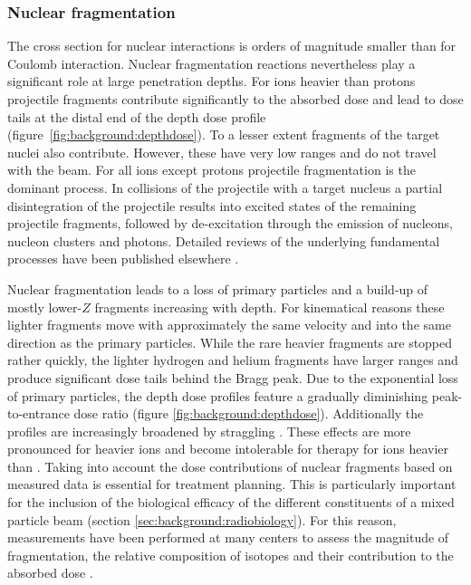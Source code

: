 \subsubsection{Nuclear fragmentation}
%
%


The cross section for nuclear interactions is orders of magnitude
smaller than for Coulomb interaction. Nuclear fragmentation reactions
nevertheless play a significant role at large penetration depths. For
ions heavier than protons projectile fragments contribute
significantly to the absorbed dose and lead to dose tails at the
distal end of the depth dose profile
(figure~\ref{fig:background:depthdose}). To a lesser extent
fragments of the target nuclei also contribute. However, these have
very low ranges and do not travel with the beam. For all ions except
protons projectile fragmentation is the dominant process. In
collisions of the projectile with a target nucleus a partial
disintegration of the projectile results into excited states of the
remaining projectile fragments, followed by de-excitation through the
emission of nucleons, nucleon clusters and photons. Detailed reviews
of the underlying fundamental processes have been published elsewhere
\citep{Goldhaber1978,Huefner1985,Lynch1987}.

Nuclear fragmentation leads to a loss of primary particles and a
build-up of mostly lower-$Z$ fragments increasing with depth. For
kinematical reasons these lighter fragments move with approximately
the same velocity and into the same direction as the primary
particles. While the rare heavier fragments are stopped rather
quickly, the lighter hydrogen and helium fragments have larger ranges
and produce significant dose tails behind the Bragg peak. Due to the
exponential loss of primary particles, the depth dose profiles feature
a gradually diminishing peak-to-entrance dose ratio (figure
\ref{fig:background:depthdose}). Additionally the profiles are
increasingly broadened by straggling \citep{Schardt2010}. These
effects are more pronounced for heavier ions and become intolerable
for therapy for ions heavier than \Netw \citep{Kraft2000}. Taking into
account the dose contributions of nuclear fragments based on measured
data is essential for treatment planning. This is particularly
important for the inclusion of the biological efficacy of the
different constituents of a mixed particle beam (section
\ref{sec:background:radiobiology}). For this reason, measurements have
been performed at many centers to assess the magnitude of
fragmentation, the relative composition of isotopes and their
contribution to the absorbed dose
\citep{Maccabee1974,Schimmerling1983,Llacer1984,Schall1996,Haettner2006}.


